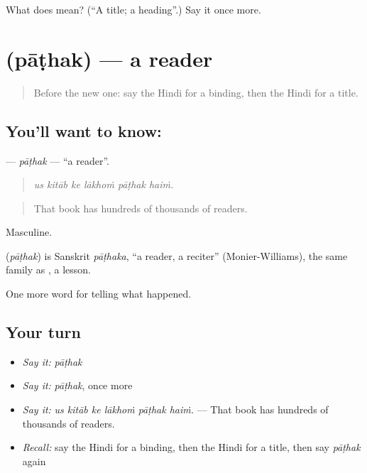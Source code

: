 \begin{tcolorbox}[breakable,colback=teal!4,colframe=teal!35!black,title={Before you move on}]
What does  mean? (\textquotedblleft{}A title; a heading\textquotedblright{}.) Say it once more.
\end{tcolorbox}
\section[\texorpdfstring{\hi{पाठक} (pāṭhak)}{पाठक (pāṭhak)}]{ (pāṭhak) — a reader}

\label{lesson:HI-C341-pathak}



\begin{quote}
Before the new one: say the Hindi for a binding, then the Hindi for a title.
\end{quote}

\subsection*{You'll want to know: }
\textbf{} — \emph{pāṭhak} — \textquotedblleft{}a reader\textquotedblright{}.

\begin{quote}
     
\end{quote}

\begin{quote}
\emph{us kitāb ke lākhoṁ pāṭhak haiṁ.}
\end{quote}

\begin{quote}
That book has hundreds of thousands of readers.
\end{quote}

Masculine.

\begin{cousinweb}
\textbf{} (\emph{pāṭhak}) is Sanskrit \emph{pāṭhaka}, \textquotedblleft{}a reader, a reciter\textquotedblright{} (Monier-Williams), the same family as \textbf{}, a lesson.
\end{cousinweb}

\begin{grammarlens}[title={What you've built}]
One more word for telling what happened.
\end{grammarlens}

\subsection*{Your turn}
\begin{itemize}
\raggedright
  \item \emph{Say it:} \emph{pāṭhak}
  \item \emph{Say it:} \emph{pāṭhak}, once more
  \item \emph{Say it:} \emph{us kitāb ke lākhoṁ pāṭhak haiṁ.} — That book has hundreds of thousands of readers.
  \item \emph{Recall:} say the Hindi for a binding, then the Hindi for a title, then say \emph{pāṭhak} again
\end{itemize}

